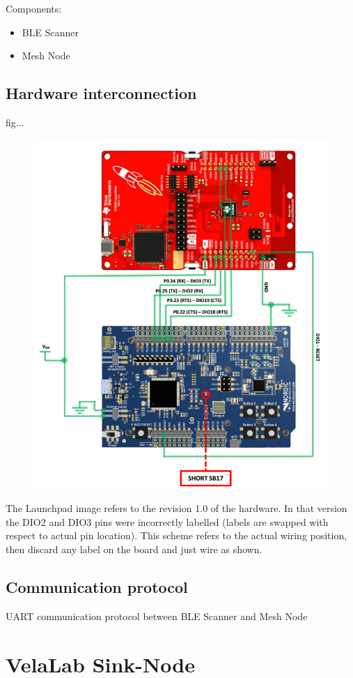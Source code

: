 \documentclass[12pt]{article}
\begin{document}
Components:
\begin{itemize}
\item{BLE Scanner}
\item{Mesh Node}
\end{itemize}



\subsection{Hardware interconnection}

fig...

\begin{figure}[!h]
	\centering
	\includegraphics[width=0.7\columnwidth]{fig/VelaNode_hw.png}
	\caption{}
	\label{fig:system}
\end{figure}

The Launchpad image refers to the revision 1.0 of the hardware. In that version the DIO2 and DIO3 pins were incorrectly labelled (labels are swapped with respect to actual pin location). This scheme refers to the actual wiring position, then discard any label on the board and just wire as shown.


\subsection{Communication protocol}

UART communication protocol between BLE Scanner and Mesh Node


\section{VelaLab Sink-Node}
\end{document}
